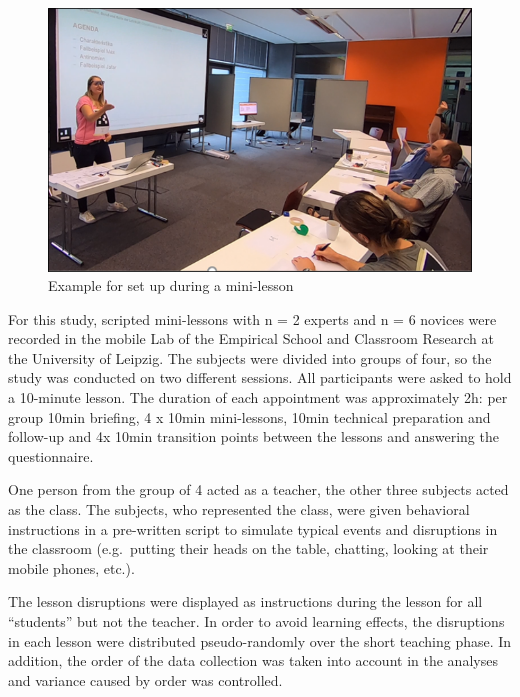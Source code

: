 \documentclass[
  english,
  man,floatsintext]{apa6}
\begin{document}
\begin{figure}

{\centering \includegraphics{./pictures/datacollection} 

}

\caption{Example for set up during a mini-lesson}\label{fig:datacollection}
\end{figure}

For this study, scripted mini-lessons with n = 2 experts and n = 6 novices were recorded in the mobile Lab of the Empirical School and Classroom Research at the University of Leipzig. The subjects were divided into groups of four, so the study was conducted on two different sessions. All participants were asked to hold a 10-minute lesson. The duration of each appointment was approximately 2h: per group 10min briefing, 4 x 10min mini-lessons, 10min technical preparation and follow-up and 4x 10min transition points between the lessons and answering the questionnaire.

One person from the group of 4 acted as a teacher, the other three subjects acted as the class. The subjects, who represented the class, were given behavioral instructions in a pre-written script to simulate typical events and disruptions in the classroom (e.g.~putting their heads on the table, chatting, looking at their mobile phones, etc.).

The lesson disruptions were displayed as instructions during the lesson for all ``students'' but not the teacher. In order to avoid learning effects, the disruptions in each lesson were distributed pseudo-randomly over the short teaching phase. In addition, the order of the data collection was taken into account in the analyses and variance caused by order was controlled.
\end{document}
